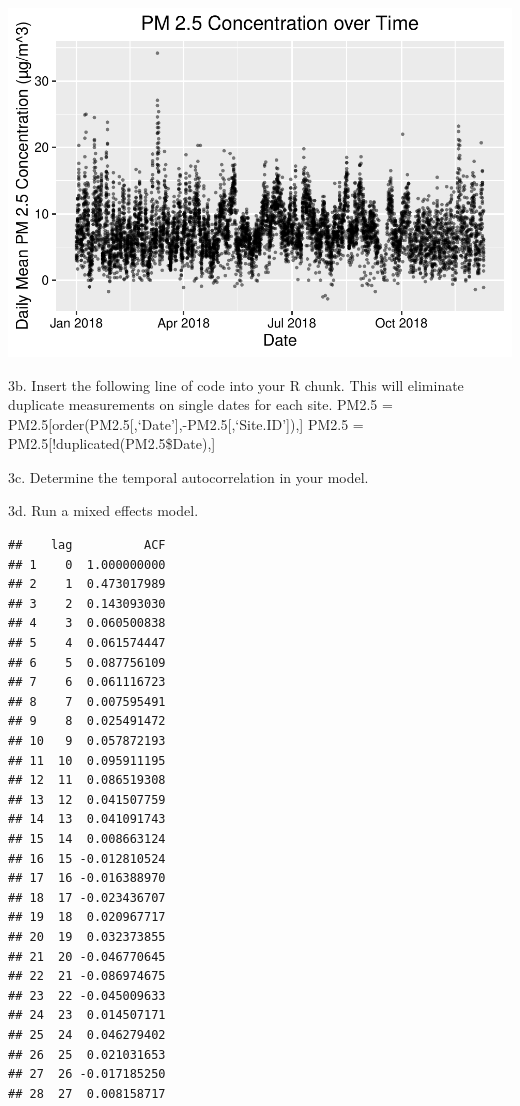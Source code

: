 \documentclass[]{article}
\newenvironment{Shaded}{\begin{snugshade}}{\end{snugshade}}
\newcommand{\KeywordTok}[1]{\textcolor[rgb]{0.13,0.29,0.53}{\textbf{#1}}}
\newcommand{\DecValTok}[1]{\textcolor[rgb]{0.00,0.00,0.81}{#1}}
\newcommand{\StringTok}[1]{\textcolor[rgb]{0.31,0.60,0.02}{#1}}
\newcommand{\CommentTok}[1]{\textcolor[rgb]{0.56,0.35,0.01}{\textit{#1}}}
\newcommand{\OperatorTok}[1]{\textcolor[rgb]{0.81,0.36,0.00}{\textbf{#1}}}
\newcommand{\NormalTok}[1]{#1}
\begin{document}
\includegraphics{A08_TimeSeries_files/figure-latex/unnamed-chunk-2-1.pdf}

3b. Insert the following line of code into your R chunk. This will
eliminate duplicate measurements on single dates for each site. PM2.5 =
PM2.5{[}order(PM2.5{[},`Date'{]},-PM2.5{[},`Site.ID'{]}),{]} PM2.5 =
PM2.5{[}!duplicated(PM2.5\$Date),{]}

3c. Determine the temporal autocorrelation in your model.

3d. Run a mixed effects model.

\begin{Shaded}
\end{Shaded}

\begin{verbatim}
##    lag          ACF
## 1    0  1.000000000
## 2    1  0.473017989
## 3    2  0.143093030
## 4    3  0.060500838
## 5    4  0.061574447
## 6    5  0.087756109
## 7    6  0.061116723
## 8    7  0.007595491
## 9    8  0.025491472
## 10   9  0.057872193
## 11  10  0.095911195
## 12  11  0.086519308
## 13  12  0.041507759
## 14  13  0.041091743
## 15  14  0.008663124
## 16  15 -0.012810524
## 17  16 -0.016388970
## 18  17 -0.023436707
## 19  18  0.020967717
## 20  19  0.032373855
## 21  20 -0.046770645
## 22  21 -0.086974675
## 23  22 -0.045009633
## 24  23  0.014507171
## 25  24  0.046279402
## 26  25  0.021031653
## 27  26 -0.017185250
## 28  27  0.008158717
\end{verbatim}
\end{document}

